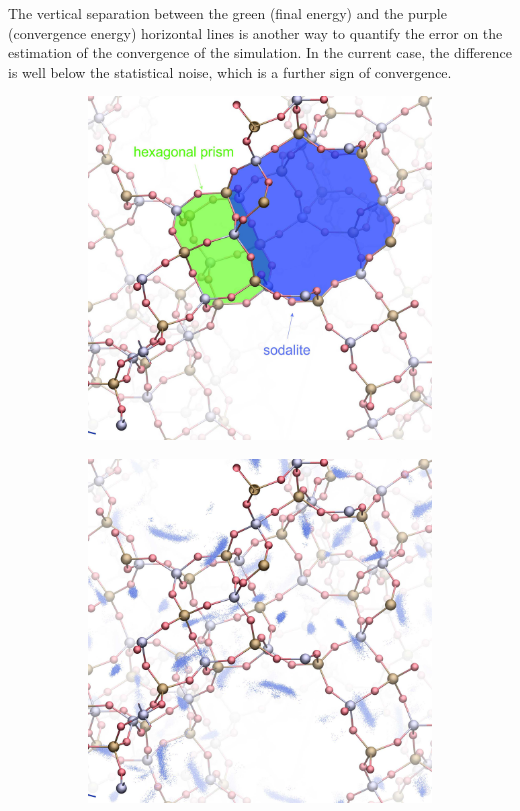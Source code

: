 \documentclass[main.tex]{subfiles}
\begin{document}
The vertical separation between the green (final energy) and the purple (convergence energy) horizontal lines is another way to quantify the error on the estimation of the convergence of the simulation. In the current case, the difference is well below the statistical noise, which is a further sign of convergence.

\begin{figure}
	\centering
	\hfill\begin{subfigure}{0.45\columnwidth}
		\centering
		\includegraphics[width=\columnwidth]{figures/cations/FAU1_cages_text.jpg}
		\label{fig:FAUdetail}
	\end{subfigure}\hfill%
	\begin{subfigure}{0.45\columnwidth}
		\centering
		\includegraphics[width=\columnwidth]{figures/cations/FAU1_density.jpg}

\end{subfigure}
\end{figure}
\end{document}

